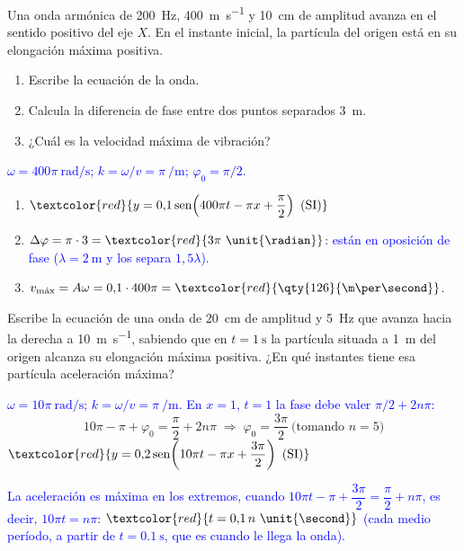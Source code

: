 \begin{exercise}
    Una onda armónica de \qty{200}{\hertz}, \qty{400}{\m\per\second} y \qty{10}{\cm} de amplitud avanza en el sentido positivo
    del eje \(X\). En el instante inicial, la partícula del origen está en su elongación máxima positiva.
    \begin{enumerate}[label=\letraminuscula]
        \item Escribe la ecuación de la onda.
        \item Calcula la diferencia de fase entre dos puntos separados \qty{3}{\m}.
        \item ¿Cuál es la velocidad máxima de vibración?
    \end{enumerate}
    \begin{solu}
        \textcolor{blue}{\(\omega = 400\pi\ \unit{\radian\per\second}\); \(k = \omega/v = \pi\ \unit{\per\m}\); \(\varphi_0 = \pi/2\).}
        \begin{enumerate}[label=\letraminuscula]
            \item \(\textcolor{red}{y = 0{,}1\sen\!\left(400\pi t - \pi x + \dfrac{\pi}{2}\right)\ \text{(SI)}}\)
            \item \(\Delta\varphi = \pi\cdot 3 = \textcolor{red}{3\pi\ \unit{\radian}}\): \textcolor{blue}{están en oposición de fase (\(\lambda = \qty{2}{\m}\) y los separa \(1{,}5\lambda\)).}
            \item \(v_{\text{máx}} = A\omega = 0{,}1\cdot 400\pi = \textcolor{red}{\qty{126}{\m\per\second}}\).
        \end{enumerate}
    \end{solu}
\end{exercise}

\begin{exercise}
    Escribe la ecuación de una onda de \qty{20}{\cm} de amplitud y \qty{5}{\hertz} que avanza hacia la derecha a
    \qty{10}{\m\per\second}, sabiendo que en \(t = \qty{1}{\second}\) la partícula situada a \qty{1}{\m} del origen alcanza
    su elongación máxima positiva. ¿En qué instantes tiene esa partícula aceleración máxima?
    \begin{solu}
        \textcolor{blue}{\(\omega = 10\pi\ \unit{\radian\per\second}\); \(k = \omega/v = \pi\ \unit{\per\m}\). En \(x = 1\), \(t = 1\) la fase debe valer \(\pi/2 + 2n\pi\):}
        \[ 10\pi - \pi + \varphi_0 = \dfrac{\pi}{2} + 2n\pi \;\Rightarrow\; \varphi_0 = \dfrac{3\pi}{2}\ \text{(tomando } n = 5\text{)} \]
        \(\textcolor{red}{y = 0{,}2\sen\!\left(10\pi t - \pi x + \dfrac{3\pi}{2}\right)\ \text{(SI)}}\)

        \textcolor{blue}{La aceleración es máxima en los extremos, cuando \(10\pi t - \pi + \dfrac{3\pi}{2} = \dfrac{\pi}{2} + n\pi\), es decir, \(10\pi t = n\pi\):}
        \(\textcolor{red}{t = 0{,}1\,n\ \unit{\second}}\) \textcolor{blue}{(cada medio período, a partir de \(t = \qty{0.1}{\second}\), que es cuando le llega la onda).}
    \end{solu}
\end{exercise}

